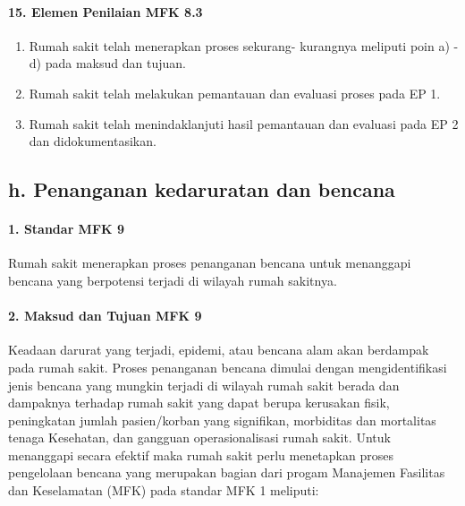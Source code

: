 \documentclass[
]{book}
\providecommand{\tightlist}{%
  \setlength{\itemsep}{0pt}\setlength{\parskip}{0pt}}
\begin{document}
\hypertarget{elemen-penilaian-mfk-8.3}{%
\paragraph*{15. Elemen Penilaian MFK 8.3}\label{elemen-penilaian-mfk-8.3}}

\begin{enumerate}
\def\labelenumi{\alph{enumi}.}
\tightlist
\item
  Rumah sakit telah menerapkan proses sekurang- kurangnya meliputi poin a) - d) pada maksud dan tujuan.
\item
  Rumah sakit telah melakukan pemantauan dan evaluasi proses pada EP 1.
\item
  Rumah sakit telah menindaklanjuti hasil pemantauan dan evaluasi pada EP 2 dan didokumentasikan.
\end{enumerate}

\hypertarget{h.-penanganan-kedaruratan-dan-bencana}{%
\subsection*{h. Penanganan kedaruratan dan bencana}\label{h.-penanganan-kedaruratan-dan-bencana}}

\hypertarget{standar-mfk-9}{%
\paragraph*{1. Standar MFK 9}\label{standar-mfk-9}}

Rumah sakit menerapkan proses penanganan bencana untuk menanggapi bencana yang berpotensi terjadi di wilayah rumah sakitnya.

\hypertarget{maksud-dan-tujuan-mfk-9}{%
\paragraph*{2. Maksud dan Tujuan MFK 9}\label{maksud-dan-tujuan-mfk-9}}

Keadaan darurat yang terjadi, epidemi, atau bencana alam akan berdampak pada rumah sakit. Proses penanganan bencana dimulai dengan mengidentifikasi jenis bencana yang mungkin terjadi di wilayah rumah sakit berada dan dampaknya terhadap rumah sakit yang dapat berupa kerusakan fisik, peningkatan jumlah pasien/korban yang signifikan, morbiditas dan mortalitas tenaga Kesehatan, dan gangguan operasionalisasi rumah sakit. Untuk menanggapi secara efektif maka rumah sakit perlu menetapkan proses pengelolaan bencana yang merupakan bagian dari progam Manajemen Fasilitas dan Keselamatan (MFK) pada standar MFK 1 meliputi:
\end{document}
